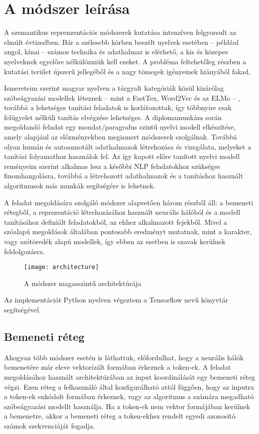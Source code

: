 \chapter{A módszer leírása}
\label{ch:method}

A szemantikus reprenzentációs módszerek kutatása intenzíven felgyorsult az elmúlt évtizedben. Bár a szélesebb körben beszélt nyelvek esetében – például angol, kínai – számos technika és adathalmaz is elérhető, a kis és közepes nyelveknek egyelőre nélkülözniük kell ezeket. A probléma  feltehetőleg részben a kutatási terület újszerű jellegéből és a nagy tömegek igényeinek hiányából fakad. 

Ismereteim szerint magyar nyelven a tárgyalt kategóriák közül kizárólag szóbeágyazási modellek léteznek – mint a FastTex, Word2Vec és az ELMo – , továbbá a lehetséges tanítási feladatok is korlátozottak, így többnyire csak felügyelet nélküli tanítás elvégzése lehetséges. A diplomamunkám során megoldandó feladat egy mondat/paragrafus szintű nyelvi modell elkészítése, amely alapjául az előzményekben megismert módszerek szolgálnak. Továbbá olyan humán és autoannotált adathalmazok létrehozása és vizsgálata, melyeket a tanítási folyamathoz használok fel. Az így kapott előre tanított nyelvi modell reményeim szerint alkalmas lesz a későbbi NLP feladatokhoz szükséges finomhangolásra, továbbá a létrehozott adathalmazok és a tanításhoz használt algoritmusok más munkák segítségére is lehetnek.

A feladat megoldására szolgáló módszer alapvetően három részből áll: a bemeneti rétegből, a reprezentáció létrehozásához használt neurális hálóból és a modell tanításához definiált feladatokból, az ehhez alkalmazott fejekből. Mivel a szóalapú megoldások általában pontosabb eredményt mutatnak, mint a karakter, vagy szótöredék alapú modellek, így ebben az esetben is szavak kerülnek feldolgozásra.

\begin{figure}[H]
	\centering
	\texttt{[image: architecture]}
	\caption{A módszer magasszintű architektúrája}
\end{figure}

Az implementációt Python nyelven végeztem a Tensorflow nevű könyvtár segítségével.

\section{Bemeneti réteg}

Ahogyan több módszer esetén is láthattuk, előfordulhat, hogy a neurális hálók bemenetére már eleve vektorizált formában érkeznek a token-ek. A feladat megoldásához használt architektúrában az input koordinálását egy bemeneti réteg végzi. Ezen réteg a felhasználó által konfigurálható attól függően, hogy az inputra a token-ek enkódolt formában érkeznek, vagy az algoritmus a számára megadható szóbeágyazási modellt használja. Ha a token-ek nem vektor formájában kerülnek a bemenetre, akkor a bemeneti réteg a token-ekhez rendelt egyedi azonosító számok szekvenciáját fogadja.

